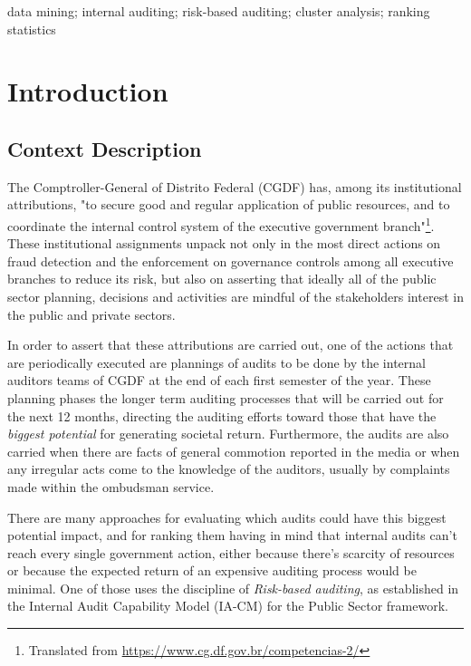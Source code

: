 \documentclass[conference]{IEEEtran}
\begin{document}
\begin{IEEEkeywords}
data mining; internal auditing; risk-based auditing; cluster analysis; ranking statistics
\end{IEEEkeywords}

\section{Introduction}
\subsection{Context Description}
The Comptroller-General of Distrito Federal (CGDF) has, among its institutional attributions, "to secure good and regular application of public resources, and to coordinate the internal control system of the executive government branch"\footnote{Translated from \url{https://www.cg.df.gov.br/competencias-2/}}. These institutional assignments unpack not only in the most direct actions on fraud detection and the enforcement on governance controls among all executive branches to reduce its risk, but also on asserting that ideally all of the public sector planning, decisions and activities are mindful of the stakeholders interest in the public and private sectors. 

In order to assert that these attributions are carried out, one of the actions that are periodically executed are plannings of audits to be done by the internal auditors teams of CGDF at the end of each first semester of the year. These planning phases the longer term auditing processes that will be carried out for the next 12 months, directing the auditing efforts toward those that have the \textit{biggest potential} for generating societal return. Furthermore, the audits are also carried when there are facts of general commotion reported in the media or when any irregular acts come to the knowledge of the auditors, usually by complaints made within the ombudsman service.

There are many approaches for evaluating which audits could have this biggest potential impact, and for ranking them having in mind that internal audits can't reach every single government action, either because there's scarcity of resources or because the expected return of an expensive auditing process would be minimal. One of those uses the discipline of \textit{Risk-based auditing}, as established in the Internal Audit Capability Model (IA-CM) for the Public Sector framework. 
\end{document}
